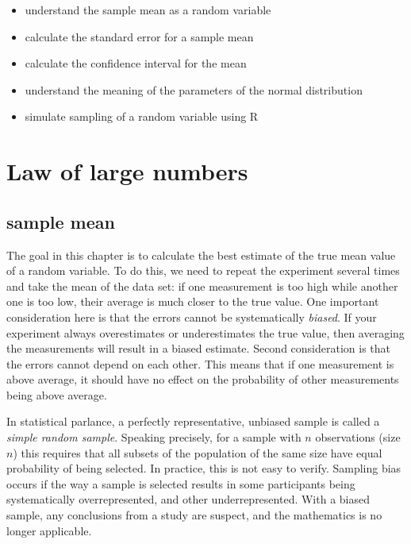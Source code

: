 \documentclass[
]{book}
\theoremstyle{definition}
\theoremstyle{definition}
\theoremstyle{definition}
\theoremstyle{remark}
\begin{document}
\begin{itemize}
\item
  understand the sample mean as a random variable
\item
  calculate the standard error for a sample mean
\item
  calculate the confidence interval for the mean
\item
  understand the meaning of the parameters of the normal distribution
\item
  simulate sampling of a random variable using R
\end{itemize}

\hypertarget{law-of-large-numbers}{%
\section{Law of large numbers}\label{law-of-large-numbers}}

\label{sec:math5_1}

\hypertarget{sample-mean}{%
\subsection{sample mean}\label{sample-mean}}

The goal in this chapter is to calculate the best estimate of the true mean value of a random variable. To do this, we need to repeat the experiment several times and take the mean of the data set: if one measurement is too high while another one is too low, their average is much closer to the true value. One important consideration here is that the errors cannot be systematically \emph{biased}. If your experiment always overestimates or underestimates the true value, then averaging the measurements will result in a biased estimate. Second consideration is that the errors cannot depend on each other. This means that if one measurement is above average, it should have no effect on the probability of other measurements being above average.

In statistical parlance, a perfectly representative, unbiased sample is called a \emph{simple random sample}. Speaking precisely, for a sample with \(n\) observations (size \(n\)) this requires that all subsets of the population of the same size have equal probability of being selected. In practice, this is not easy to verify. Sampling bias occurs if the way a sample is selected results in some participants being systematically overrepresented, and other underrepresented. With a biased sample, any conclusions from a study are suspect, and the mathematics is no longer applicable.
\end{document}
